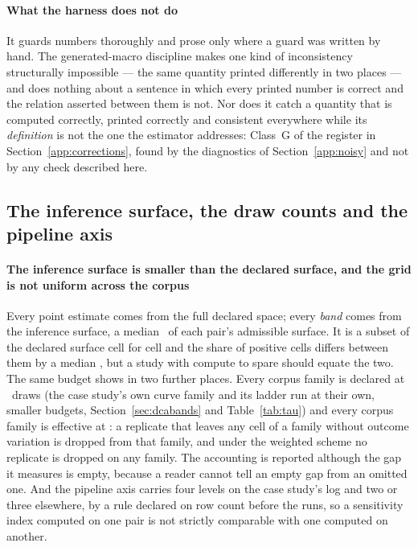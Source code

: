 \paragraph{What the harness does not do}
It guards numbers thoroughly and prose only where a guard was written by hand.
The generated-macro discipline makes one kind of inconsistency structurally
impossible --- the same quantity printed differently in two places --- and
does nothing about a sentence in which every printed number is correct and
the relation asserted between them is not. Nor does it catch a quantity that
is computed correctly, printed correctly and consistent everywhere while its
\emph{definition} is not the one the estimator addresses: Class~G of the
register in Section~\ref{app:corrections}, found by the diagnostics of
Section~\ref{app:noisy} and not by any check described here.

\subsection{The inference surface, the draw counts and the pipeline axis}
\label{app:budget}


\paragraph{The inference surface is smaller than the declared surface, and the
grid is not uniform across the corpus}
Every point estimate comes from the full declared space; every \emph{band}
comes from the inference surface, a median
\inferenceShareAdmissibleMedianPct\ of each pair's admissible surface. It
is a subset of the declared surface cell for
cell and the share of positive cells differs between them by a median
\repGapMedian, but a study with compute to spare should equate the two. The
same budget shows in two further places. Every corpus family is declared at
\nDrawsSurfaceMax\ draws (the case study's own curve family and its ladder
run at their own, smaller budgets, Section~\ref{sec:dcabands} and
Table~\ref{tab:tau}) and every corpus family is effective at
\nDrawsEffectiveMin: a replicate that leaves any cell of a family without
outcome variation is dropped from that family, and under the weighted scheme
no replicate is dropped on any family. The accounting is reported although
the gap it measures is empty, because a reader cannot tell an empty gap from
an omitted one. And the pipeline axis
carries four levels on the case study's log and two or three elsewhere, by a
rule declared on row count before the runs, so a sensitivity index computed on
one pair is not strictly comparable with one computed on another.


